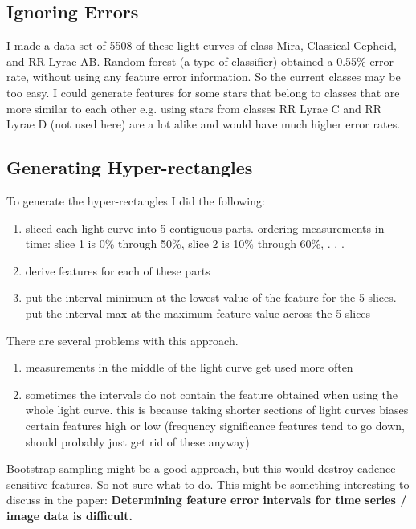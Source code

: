 \documentclass[11pt]{article}
\begin{document}
\subsection{Ignoring Errors}
I made a data set of 5508 of these light curves of class Mira, Classical Cepheid, and RR Lyrae AB. Random forest (a type of classifier) obtained a 0.55\% error rate, without using any feature error information. So the current classes may be too easy. I could generate features for some stars that belong to classes that are more similar to each other e.g. using stars from classes RR Lyrae C and RR Lyrae D (not used here) are a lot alike and would have much higher error rates.

\subsection{Generating Hyper-rectangles}
To generate the hyper-rectangles I did the following:
\begin{enumerate}
\item sliced each light curve into 5 contiguous parts. ordering measurements in time: slice 1 is 0\% through 50\%, slice 2 is 10\% through 60\%, . . .
\item derive features for each of these parts
\item put the interval minimum at the lowest value of the feature for the 5 slices. put the interval max at the maximum feature value across the 5 slices
\end{enumerate}
There are several problems with this approach.
\begin{enumerate}
\item measurements in the middle of the light curve get used more often
\item sometimes the intervals do not contain the feature obtained when using the whole light curve. this is because taking shorter sections of light curves biases certain features high or low (frequency significance features tend to go down, should probably just get rid of these anyway)
\end{enumerate}
Bootstrap sampling might be a good approach, but this would destroy cadence sensitive features. So not sure what to do. This might be something interesting to discuss in the paper: \textbf{Determining feature error intervals for time series / image data is difficult.}
\end{document}
